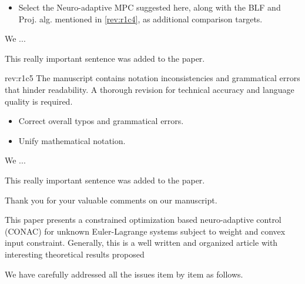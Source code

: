 \documentclass[12pt,english]{reviewresponse}
\begin{document}
\begin{howtoanswer}
    \begin{itemize}
        \item Select the Neuro-adaptive MPC suggested here, along with the BLF and Proj. alg. mentioned in \cref{rev:r1c4}, as additional comparison targets.
    \end{itemize}
\end{howtoanswer}

\begin{revresponse}
    We ...
    \begin{changes}
        This really important sentence was added to the paper.
    \end{changes}
\end{revresponse}

\begin{revcomment}[3]{rev:r1c5}
    The manuscript contains notation inconsistencies and grammatical errors that hinder readability. A thorough revision for technical accuracy and language quality is required.
\end{revcomment}

\begin{howtoanswer}
    \begin{itemize}
        \item Correct overall typos and grammatical errors.
        \item Unify mathematical notation.
    \end{itemize}
\end{howtoanswer}

\begin{revresponse}
    We ...
    \begin{changes}
        This really important sentence was added to the paper.
    \end{changes}
\end{revresponse}

\begin{concludingresponse}[]
    Thank you for your valuable comments on our manuscript. 
\end{concludingresponse}

\reviewer
\begin{generalcomment}
    This paper presents a constrained optimization based neuro-adaptive control (CONAC) for unknown Euler-Lagrange systems subject to weight and convex input constraint. Generally, this is a well written and organized article with interesting theoretical results proposed
\end{generalcomment}
\begin{revresponse}
    We have carefully addressed all the issues item by item as follows.
\end{revresponse}
\end{document}
